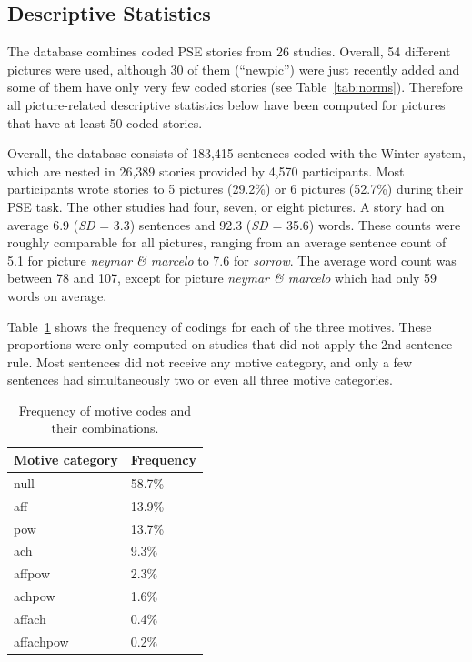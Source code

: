 \documentclass[jou,a4paper]{apa6}\usepackage[]{graphicx}\usepackage[]{color}
\begin{document}
\begin{table}
\begin{tabularx}{\textwidth}{XXrrrl}
		\bottomrule
		\end{tabularx}
\end{table}

\subsection{Descriptive Statistics}

The database combines coded PSE stories from 26 studies. Overall, 54 different pictures were used, although 30 of them (``newpic'') were just recently added and some of them have only very few coded stories (see Table~\ref{tab:norms}). Therefore all picture-related descriptive statistics below have been computed for pictures that have at least 50 coded stories.

Overall, the database consists of 183,415 sentences coded with the Winter system, which are nested in 26,389 stories provided by 4,570 participants. Most participants wrote stories to 5 pictures (29.2\%) or 6 pictures (52.7\%) during their PSE task. The other studies had four, seven, or eight pictures. A story had on average 6.9 (\emph{SD} = 3.3) sentences and 92.3 (\emph{SD} = 35.6) words. These counts were roughly comparable for all pictures, ranging from an average sentence count of 5.1 for picture \emph{neymar \& marcelo} to 7.6 for \emph{sorrow}. The average word count was between 78 and 107, except for picture \emph{neymar \& marcelo} which had only 59 words on average.


Table~\ref{tab:motcat} shows the frequency of codings for each of the three motives. These proportions were only computed on studies that did not apply the 2nd-sentence-rule. Most sentences did not receive any motive category, and only a few sentences had simultaneously two or even all three motive categories.

\begin{table}[ht]
\centering
\caption{Frequency of motive codes and their combinations.} 
\label{tab:motcat}
\begin{tabular}{ll}
  \hline
Motive category & Frequency \\ 
  \hline
null & 58.7\% \\ 
  aff & 13.9\% \\ 
  pow & 13.7\% \\ 
  ach & 9.3\% \\ 
  affpow & 2.3\% \\ 
  achpow & 1.6\% \\ 
  affach & 0.4\% \\ 
  affachpow & 0.2\% \\ 
   \hline
\end{tabular}
\end{table}
\end{document}
